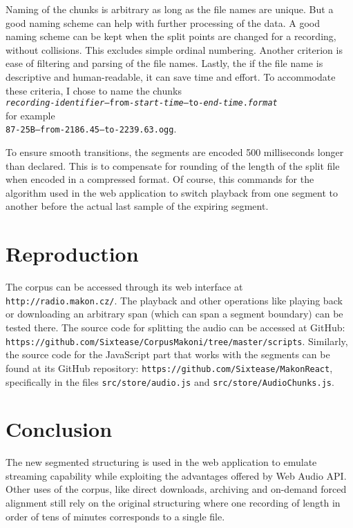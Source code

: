 \documentclass{llncs}
\begin{document}
Naming of the chunks is arbitrary as long as the file names are unique. But a
good naming scheme can help with further processing of the data. A good naming
scheme can be kept when the split points are changed for a recording, without
collisions. This excludes simple ordinal numbering. Another criterion is ease of
filtering and parsing of the file names. Lastly, the if the file name is
descriptive and human-readable, it can save time and effort. To accommodate
these criteria, I chose to name the chunks \\
\texttt{{\em{}recording-identifier}--from-{\em{}start-time}--to-{\em{}end-time}.{\em{}format}} \\
for example \\
\texttt{87-25B--from-2186.45--to-2239.63.ogg}.

To ensure smooth transitions, the segments are encoded 500 milliseconds longer
than declared. This is to compensate for rounding of the length of the split
file when encoded in a compressed format. Of course, this commands for the
algorithm used in the web application to switch playback from one segment to
another before the actual last sample of the expiring segment.

\section{Reproduction}

The corpus can be accessed through its web interface at
\texttt{http://radio.makon.cz/}. The playback and other operations like playing
back or downloading an arbitrary span (which can span a segment boundary) can be
tested there. The source code for splitting the audio can be accessed at
GitHub: \\
\texttt{https://github.com/Sixtease/CorpusMakoni/tree/master/scripts}.
Similarly, the source code for the JavaScript part that works with the segments
can be found at its GitHub repository:
\texttt{https://github.com/Sixtease/MakonReact}, specifically in the files
\texttt{src/store/audio.js} and \texttt{src/store/AudioChunks.js}.

\section{Conclusion}

The new segmented structuring is used in the web application to emulate streaming capability while exploiting the advantages offered by Web Audio API. Other uses of the corpus, like direct downloads, archiving and on-demand forced alignment still rely on the original structuring where one recording of length in order of tens of minutes corresponds to a single file.
\end{document}
